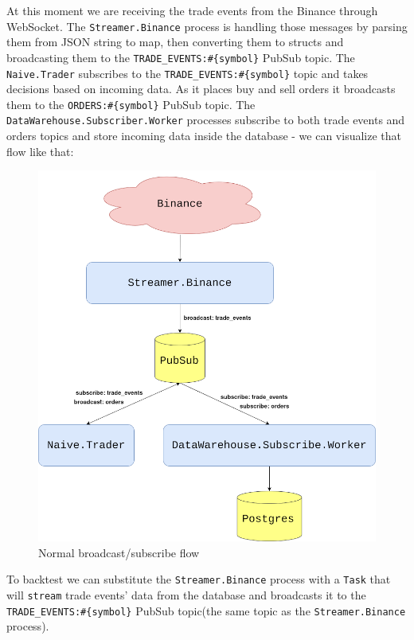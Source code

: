\documentclass[
]{book}
\begin{document}
At this moment we are receiving the trade events from the Binance through WebSocket. The \texttt{Streamer.Binance} process is handling those messages by parsing them from JSON string to map, then converting them to structs and broadcasting them to the \texttt{TRADE\_EVENTS:\#\{symbol\}} PubSub topic. The \texttt{Naive.Trader} subscribes to the \texttt{TRADE\_EVENTS:\#\{symbol\}} topic and takes decisions based on incoming data. As it places buy and sell orders it broadcasts them to the \texttt{ORDERS:\#\{symbol\}} PubSub topic. The \texttt{DataWarehouse.Subscriber.Worker} processes subscribe to both trade events and orders topics and store incoming data inside the database - we can visualize that flow like that:

\begin{figure}
\centering
\includegraphics{images/chapter_14_02_current_pubsub.png}
\caption{Normal broadcast/subscribe flow}
\end{figure}

To backtest we can substitute the \texttt{Streamer.Binance} process with a \texttt{Task} that will \texttt{stream} trade events' data from the database and broadcasts it to the \texttt{TRADE\_EVENTS:\#\{symbol\}} PubSub topic(the same topic as the \texttt{Streamer.Binance} process).
\end{document}
